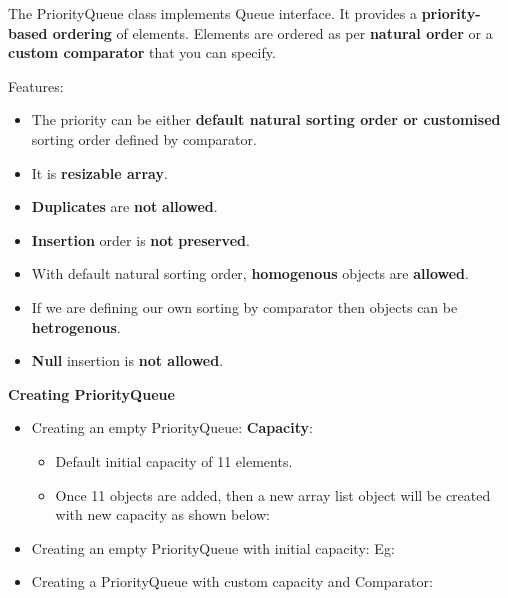 \setlength{\columnsep}{3pt}
\begin{flushleft}
	
		The PriorityQueue class implements Queue interface.
		\newline
		It provides a \textbf{priority-based ordering} of elements. 
		\newline
		Elements are ordered as per \textbf{natural order} or a \textbf{custom comparator} that you can specify.

		\newpage
		\item Features:
		\begin{itemize}
			\item The priority can be either \textbf{default natural sorting order or customised} sorting order defined by comparator.
			\item It is \textbf{resizable array}.
			\item \textbf{Duplicates} are \textbf{not} \textbf{allowed}.
			\item \textbf{Insertion} order is \textbf{not} \textbf{preserved}.
			\item With default natural sorting order, \textbf{homogenous} objects are \textbf{allowed}.
			\item If we are defining our own sorting by comparator then objects can be \textbf{hetrogenous}.
			\item \textbf{Null} insertion is \textbf{not allowed}.
		\end{itemize}
		
		\textbf{Creating PriorityQueue}
		\begin{itemize}
			\item Creating an empty PriorityQueue:
			\bigskip			
			\textbf{Capacity}:
			\begin{itemize}
				\item Default initial capacity of 11 elements. 
				\item Once 11 objects are added, then a new array list object will be created with new capacity as shown below:
				\bigskip
			\end{itemize}
		
			\item Creating an empty PriorityQueue with initial capacity:
			\bigskip			
			Eg:
			\newpage
			\item Creating a PriorityQueue with custom capacity and Comparator:
			\bigskip
		\end{itemize}


\end{flushleft}
